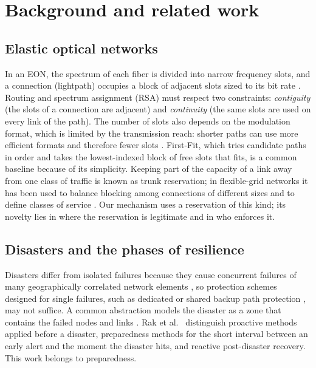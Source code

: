 \documentclass[11pt,a4paper]{article}
\theoremstyle{definition}
\begin{document}
\section{Background and related work}
\label{sec:background}

\subsection{Elastic optical networks}

In an EON, the spectrum of each fiber is divided into narrow frequency slots, and a connection (lightpath) occupies a block of adjacent slots sized to its bit rate \cite{jinno2009spectrum,jinno2010distance}.
Routing and spectrum assignment (RSA) must respect two constraints: \emph{contiguity} (the slots of a connection are adjacent) and \emph{continuity} (the same slots are used on every link of the path).
The number of slots also depends on the modulation format, which is limited by the transmission reach: shorter paths can use more efficient formats and therefore fewer slots \cite{jinno2010distance}.
First-Fit, which tries candidate paths in order and takes the lowest-indexed block of free slots that fits, is a common baseline because of its simplicity.
Keeping part of the capacity of a link away from one class of traffic is known as trunk reservation; in flexible-grid networks it has been used to balance blocking among connections of different sizes \cite{callegati2014trunk} and to define classes of service \cite{bonani2018soft}.
Our mechanism uses a reservation of this kind; its novelty lies in where the reservation is legitimate and in who enforces it.

\subsection{Disasters and the phases of resilience}

Disasters differ from isolated failures because they cause concurrent failures of many geographically correlated network elements \cite{rak2021disaster}, so protection schemes designed for single failures, such as dedicated or shared backup path protection \cite{shen2016survivable}, may not suffice.
A common abstraction models the disaster as a zone that contains the failed nodes and links \cite{zou2021drama,zou2022dramaplus}.
Rak et al.\ \cite{rak2021disaster} distinguish proactive methods applied before a disaster, preparedness methods for the short interval between an early alert and the moment the disaster hits, and reactive post-disaster recovery.
This work belongs to preparedness.
\end{document}
